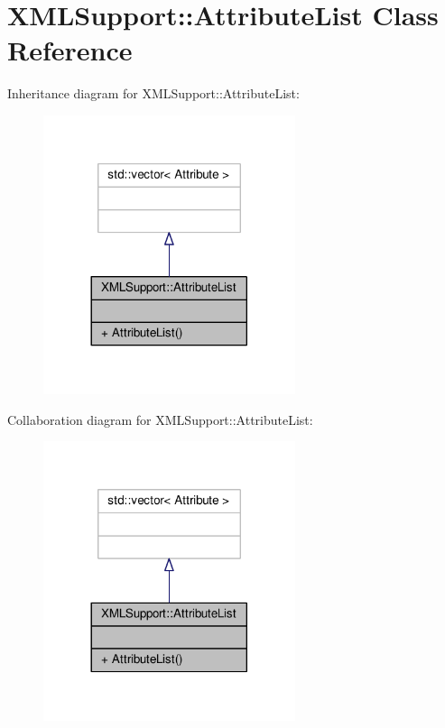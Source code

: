 \hypertarget{classXMLSupport_1_1AttributeList}{}\section{X\+M\+L\+Support\+:\+:Attribute\+List Class Reference}
\label{classXMLSupport_1_1AttributeList}


Inheritance diagram for X\+M\+L\+Support\+:\+:Attribute\+List\+:
\nopagebreak
\begin{figure}[H]
\begin{center}
\leavevmode
\includegraphics[width=209pt]{d6/d75/classXMLSupport_1_1AttributeList__inherit__graph}
\end{center}
\end{figure}


Collaboration diagram for X\+M\+L\+Support\+:\+:Attribute\+List\+:
\nopagebreak
\begin{figure}[H]
\begin{center}
\leavevmode
\includegraphics[width=209pt]{dc/d0f/classXMLSupport_1_1AttributeList__coll__graph}
\end{center}
\end{figure}
